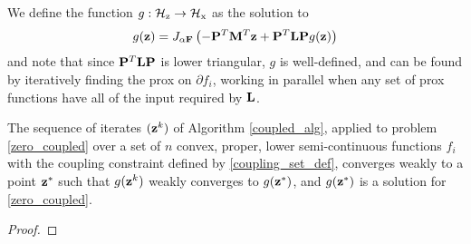 We define the function $g : \mathcal{H}_\text{z} \to \mathcal{H}_\text{x}$ as the solution to 
\begin{equation}\label{g_def}
    g(\mathbf{z}) = J_{\alpha \mathbf{F}}\left(-\mathbf{P}^T\mathbf{M}^T\mathbf{z} + \mathbf{P}^T\mathbf{L} \mathbf{P}g(\mathbf{z})\right)
\end{equation}
and note that since $\mathbf{P}^T\mathbf{L}\mathbf{P}$ is lower triangular, $g$ is well-defined, and can be found by iteratively finding the prox on $\partial f_i$, working in parallel when any set of prox functions have all of the input required by $\mathbf{L}$.
\begin{theorem}
The sequence of iterates $(\mathbf{z}^k)$ of Algorithm \ref{coupled_alg}, applied to problem \eqref{zero_coupled} over a set of $n$ convex, proper, lower semi-continuous functions $f_i$ with the coupling constraint defined by \eqref{coupling_set_def}, converges weakly to a point $\mathbf{z}^*$ such that $g(\mathbf{z}^k)$ weakly converges to $g(\mathbf{z}^*)$, and $g(\mathbf{z}^*)$ is a solution for \eqref{zero_coupled}.
\end{theorem}

\begin{proof}

\end{proof}